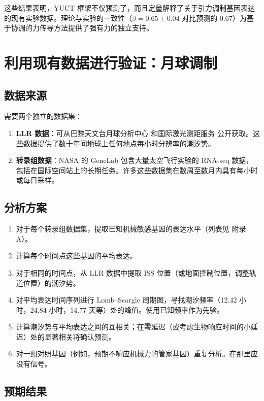 \documentclass[12pt,a4paper]{article}
\theoremstyle{remark}
\begin{document}
	这些结果表明，YUCT 框架不仅预测了，而且定量解释了关于引力调制基因表达的现有实验数据。理论与实验的一致性（\(\beta = 0.65 \pm 0.04\) 对比预测的 \(0.67\)）为基于协调的力传导方法提供了强有力的独立支持。
	
	\section{利用现有数据进行验证：月球调制}
	\label{sec:verification}
	
	\subsection{数据来源}
	
	需要两个独立的数据集：
	
	\begin{enumerate}
		\item \textbf{LLR 数据}：可从巴黎天文台月球分析中心 \cite{LLR-POLAC} 和国际激光测距服务 \cite{ILRS} 公开获取。这些数据提供了数十年间地球上任何地点每小时分辨率的潮汐势。
		\item \textbf{转录组数据}：NASA 的 GeneLab \cite{NASA-GeneLab} 包含大量太空飞行实验的 RNA-seq 数据，包括在国际空间站上的长期任务。许多这些数据集在数周至数月内具有每小时或每日采样。
	\end{enumerate}
	
	\subsection{分析方案}
	
	\begin{enumerate}
		\item 对于每个转录组数据集，提取已知机械敏感基因的表达水平（列表见 \cite{NASA-GeneLab} 附录 A）。
		\item 计算每个时间点这些基因的平均表达。
		\item 对于相同的时间点，从 LLR 数据中提取 ISS 位置（或地面控制位置，调整轨道位置）的潮汐势。
		\item 对平均表达时间序列进行 Lomb–Scargle 周期图，寻找潮汐频率（12.42 小时，24.84 小时，14.77 天等）处的峰值。使用已知频率作为先验。
		\item 计算潮汐势与平均表达之间的互相关；在零延迟（或考虑生物响应时间的小延迟）处的显著相关将确认预测。
		\item 对一组对照基因（例如，预期不响应机械力的管家基因）重复分析。在那里应没有信号。
	\end{enumerate}
	
	\subsection{预期结果}
	
\end{document}
